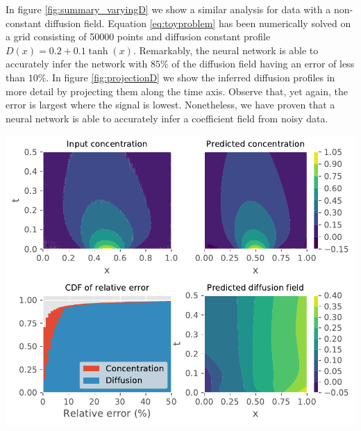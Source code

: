 \documentclass{Dissertate}
\let\origfigure\figure
\let\endorigfigure\endfigure
\renewenvironment{figure}[1][2] {
    \expandafter\origfigure\expandafter[H]
} {
    \endorigfigure
}
\begin{document}
In figure \ref{fig:summary_varyingD} we show a similar analysis for
data with a non-constant diffusion field. Equation
\ref{eq:toyproblem} has been numerically solved on a grid consisting
of 50000 points and diffusion constant profile
\(D(x) = 0.2 + 0.1\tanh(x)\). Remarkably, the neural network is able to
accurately infer the network with \(85\%\) of the diffusion field having
an error of less than \(10\%\). In figure \ref{fig:projectionD} we
show the inferred diffusion profiles in more detail by projecting them
along the time axis. Observe that, yet again, the error is largest where
the signal is lowest. Nonetheless, we have proven that a neural network is
able to accurately infer a coefficient field from noisy data.

\begin{figure}
\hypertarget{fig:summary_varyingD}{%
\centering
\includegraphics{source/figures/pdf/summary_varyingD_varyingPINN.pdf}
\caption{We show the training data and predicted concentration profile
in the upper left and right panels. The lower right panel shows the
inferred diffusion field while the lower left panel shows the CDF of the
relative error of the diffusion and
concentration.}\label{fig:summary_varyingD}
}
\end{figure}
\end{document}
